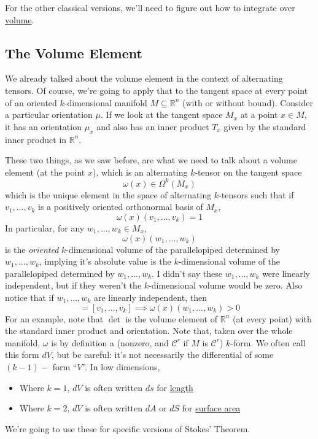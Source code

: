 \documentclass{article}
\newcommand{\reals}[0]{\mathbb{R}}
\newcommand{\mc}[1]{\mathcal{#1}}
\begin{document}
For the other classical versions, we'll need to figure out how to integrate over \underline{volume}.

\subsection{The Volume Element}

We already talked about the volume element in the context of alternating tensors. Of course, we're going to apply that to the tangent space at every point of an oriented \(k\)-dimensional manifold \(M \subseteq \reals^n\) (with or without bound). Consider a particular orientation \(\mu\). If we look at the tangent space \(M_x\) at a point \(x \in M\), it has an orientation \(\mu_x\) and also has an inner product \(T_x\) given by the standard inner product in \(\reals^n\).

These two things, as we saw before, are what we need to talk about a volume element (at the point \(x\)), which is an alternating \(k\)-tensor on the tangent space
\begin{equation}
  \omega(x) \in \Omega^k(M_x)
\end{equation}
which is the unique element in the space of alternating \(k\)-tensors such that if \(v_1,...,v_k\) is a positively oriented orthonormal basis of \(M_x\),
\begin{equation}
  \omega(x)(v_1,...,v_k) = 1
\end{equation}
In particular, for any \(w_1,...,w_k \in M_x\),
\begin{equation}
  \omega(x)(w_1,...,w_k)
\end{equation}
is the \textit{oriented} \(k\)-dimensional volume of the parallelopiped determined by \(w_1,...,w_k\), implying it's absolute value is the \(k\)-dimensional volume of the parallelopiped determined by \(w_1,...,w_k\). I didn't say these \(w_1,...,w_k\) were linearly independent, but if they weren't the \(k\)-dimensional volume would be zero. Also notice that if \(w_1,...,w_k\) are linearly independent, then
\begin{equation}
  [w_1,...,w_k] = [v_1,...,v_k] \implies \omega(x)(w_1,...,w_k) > 0
\end{equation}
For an example, note that \(\det\) is the volume element of \(\reals^n\) (at every point) with the standard inner product and orientation.
Note that, taken over the whole manifold, \(\omega\) is by definition a (nonzero, and \(\mc{C}^r\) if \(M\) is \(\mc{C}^r\)) \(k\)-form. We often call this form \(dV\), but be careful: it's not necessarily the differential of some \((k - 1)-\) form ``\(V\)''. In low dimensions,
\begin{itemize}
  \item Where \(k = 1\), \(dV\) is often written \(ds\) for \underline{length}
  \item Where \(k = 2\), \(dV\) is often written \(dA\) or \(dS\) for \underline{surface area}
\end{itemize}
We're going to use these for specific versions of Stokes' Theorem.
\end{document}
